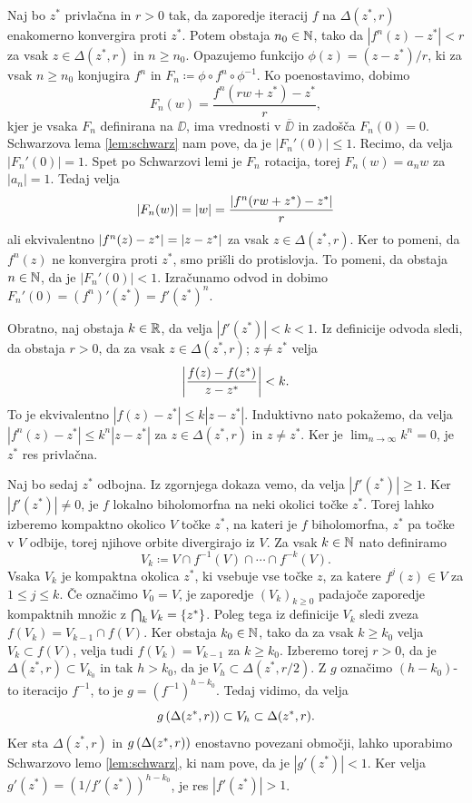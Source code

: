\begin{dokaz}
    Naj bo \(z^*\) privlačna in \(r > 0\) tak, da zaporedje iteracij \(f\) na \(\Delta (z^*, r)\) enakomerno konvergira proti \(z^*\). Potem obstaja \(n_0 \in \mathbb N\), tako da \(|f^n (z) - z^*| < r\) za vsak \(z \in \Delta (z^*, r)\) in \(n \geq n_0\). Opazujemo funkcijo \(\phi (z) = (z - z^*) / r\), ki za vsak \(n \geq n_0\) konjugira \(f^n\) in \(F_n \coloneq \phi \circ f^n \circ \phi^{-1}\). Ko poenostavimo, dobimo
    \[F_n (w) = \frac{f^n (r w + z^*) - z^*}{r},\]
    kjer je vsaka \(F_n\) definirana na \(\DD\), ima vrednosti v \(\overline{\DD}\) in zadošča \(F_n (0) = 0\). Schwarzova lema \ref{lem:schwarz} nam pove, da je \(|F_n' (0)| \leq 1\). Recimo, da velja \(|F_n' (0)| = 1\). Spet po Schwarzovi lemi je \(F_n\) rotacija, torej \(F_n (w) = a_n w\) za \(|a_n| = 1\). Tedaj velja
    \[\left\lvert F_n (w)\right\rvert = \left\lvert w\right\rvert = \frac{\left\lvert f^n (r w + z^*) - z^*\right\rvert}{r}\]
    ali ekvivalentno \(\left\lvert f^n (z) - z^*\right\rvert = \left\lvert z - z^*\right\rvert\) za vsak \(z \in \Delta (z^*, r)\). Ker to pomeni, da \(f^n (z)\) ne konvergira proti \(z^*\), smo prišli do protislovja. To pomeni, da obstaja \(n \in \mathbb N\), da je \(|F_n' (0)| < 1\). Izračunamo odvod in dobimo \(F_n' (0) = (f^n)' (z^*) = f' (z^*)^n\).

    Obratno, naj obstaja \(k \in \mathbb R\), da velja \(|f' (z^*)| < k < 1\). Iz definicije odvoda sledi, da obstaja \(r > 0\), da za vsak \(z \in \Delta (z^*, r)\); \(z \neq z^*\) velja
    \[\left\lvert\frac{f (z) - f (z^*)}{z - z^*}\right\rvert < k.\]
    To je ekvivalentno \(|f (z) - z^*| \leq k |z - z^*|\). Induktivno nato pokažemo, da velja \(|f^n (z) - z^*| \leq k^n |z - z^*|\) za \(z \in \Delta (z^*, r)\) in \(z \neq z^*\). Ker je \(\lim_{n \to \infty} k^n = 0\), je \(z^*\) res privlačna.

    Naj bo sedaj \(z^*\) odbojna. Iz zgornjega dokaza vemo, da velja \(|f' (z^*)| \geq 1\). Ker \(|f' (z^*)| \neq 0\), je \(f\) lokalno biholomorfna na neki okolici točke \(z^*\). Torej lahko izberemo kompaktno okolico \(V\) točke \(z^*\), na kateri je \(f\) biholomorfna, \(z^*\) pa točke v \(V\) odbije, torej njihove orbite divergirajo iz \(V\). Za vsak \(k \in \mathbb N\) nato definiramo
    \[V_k \coloneq V \cap f^{-1} (V) \cap \cdots \cap f^{- k} (V).\]
    Vsaka \(V_k\) je kompaktna okolica \(z^*\), ki vsebuje vse točke \(z\), za katere \(f^j (z) \in V\) za \(1 \leq j \leq k\). Če označimo \(V_0 = V\), je zaporedje \((V_k)_{k \geq 0}\) padajoče zaporedje kompaktnih množic z \(\bigcap_k V_k = \left\{ z^* \right\}\). Poleg tega iz definicije \(V_k\) sledi zveza \(f (V_k) = V_{k - 1} \cap f (V)\). Ker obstaja \(k_0 \in \mathbb N\), tako da za vsak \(k \geq k_0\) velja \(V_k \subset f (V)\), velja tudi \(f (V_k) = V_{k - 1}\) za \(k \geq k_0\). Izberemo torej \(r > 0\), da je \(\Delta (z^*, r) \subset V_{k_0}\) in tak \(h > k_0\), da je \(V_h \subset \Delta (z^*, r / 2)\). Z \(g\) označimo \((h - k_0)\)-to iteracijo \(f^{-1}\), to je \(g = (f^{-1})^{h - k_0}\). Tedaj vidimo, da velja
    \[g \left( \Delta (z^*, r) \right) \subset V_h \subset \Delta (z^*, r).\]
    Ker sta \(\Delta (z^*, r)\) in \(g \left( \Delta (z^*, r) \right)\) enostavno povezani območji, lahko uporabimo Schwarzovo lemo \ref{lem:schwarz}, ki nam pove, da je \(|g' (z^*)| < 1\). Ker velja \(g' (z^*) = (1 / f' (z^*))^{h - k_0}\), je res \(|f' (z^*)| > 1\).


\end{dokaz}
